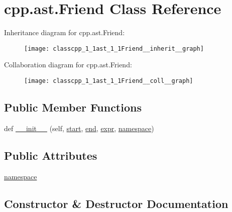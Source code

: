 \hypertarget{classcpp_1_1ast_1_1Friend}{}\section{cpp.\+ast.\+Friend Class Reference}
\label{classcpp_1_1ast_1_1Friend}


Inheritance diagram for cpp.\+ast.\+Friend\+:
\nopagebreak
\begin{figure}[H]
\begin{center}
\leavevmode
\texttt{[image: classcpp\_1\_1ast\_1\_1Friend\_\_inherit\_\_graph]}
\end{center}
\end{figure}


Collaboration diagram for cpp.\+ast.\+Friend\+:
\nopagebreak
\begin{figure}[H]
\begin{center}
\leavevmode
\texttt{[image: classcpp\_1\_1ast\_1\_1Friend\_\_coll\_\_graph]}
\end{center}
\end{figure}
\subsection*{Public Member Functions}
\begin{DoxyCompactItemize}
\item 
def \hyperlink{classcpp_1_1ast_1_1Friend_a9fe245d0f14eaab85435e942a56de7e6}{\+\_\+\+\_\+init\+\_\+\+\_\+} (self, \hyperlink{classcpp_1_1ast_1_1Node_a7b2aa97e6a049bb1a93aea48c48f1f44}{start}, \hyperlink{classcpp_1_1ast_1_1Node_a3c5e5246ccf619df28eca02e29d69647}{end}, \hyperlink{classcpp_1_1ast_1_1Expr_a2f4e13fb0176f2616f8703103c806462}{expr}, \hyperlink{classcpp_1_1ast_1_1Friend_a076c68dddae9bd1e24d224d005538014}{namespace})
\end{DoxyCompactItemize}
\subsection*{Public Attributes}
\begin{DoxyCompactItemize}
\item 
\hyperlink{classcpp_1_1ast_1_1Friend_a076c68dddae9bd1e24d224d005538014}{namespace}
\end{DoxyCompactItemize}


\subsection{Constructor \& Destructor Documentation}
